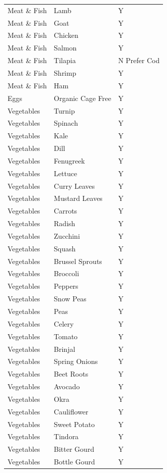 \documentclass[
  oneside]{book}
\begin{document}
\begin{longtable}[t]{lll}
\endfoot
\bottomrule
\endlastfoot
Meat \& Fish & Lamb & Y\\
Meat \& Fish & Goat & Y\\
Meat \& Fish & Chicken & Y\\
Meat \& Fish & Salmon & Y\\
Meat \& Fish & Tilapia & N
Prefer Cod\\
\addlinespace
Meat \& Fish & Shrimp & Y\\
Meat \& Fish & Ham & Y\\
Eggs & Organic Cage Free & Y\\
Vegetables & Turnip & Y\\
Vegetables & Spinach & Y\\
\addlinespace
Vegetables & Kale & Y\\
Vegetables & Dill & Y\\
Vegetables & Fenugreek & Y\\
Vegetables & Lettuce & Y\\
Vegetables & Curry Leaves & Y\\
\addlinespace
Vegetables & Mustard Leaves & Y\\
Vegetables & Carrots & Y\\
Vegetables & Radish & Y\\
Vegetables & Zucchini & Y\\
Vegetables & Squash & Y\\
\addlinespace
Vegetables & Brussel Sprouts & Y\\
Vegetables & Broccoli & Y\\
Vegetables & Peppers & Y\\
Vegetables & Snow Peas & Y\\
Vegetables & Peas & Y\\
\addlinespace
Vegetables & Celery & Y\\
Vegetables & Tomato & Y\\
Vegetables & Brinjal & Y\\
Vegetables & Spring Onions & Y\\
Vegetables & Beet Roots & Y\\
\addlinespace
Vegetables & Avocado & Y\\
Vegetables & Okra & Y\\
Vegetables & Cauliflower & Y\\
Vegetables & Sweet Potato & Y\\
Vegetables & Tindora & Y\\
\addlinespace
Vegetables & Bitter Gourd & Y\\
Vegetables & Bottle Gourd & Y\\

\end{longtable}
\end{document}
